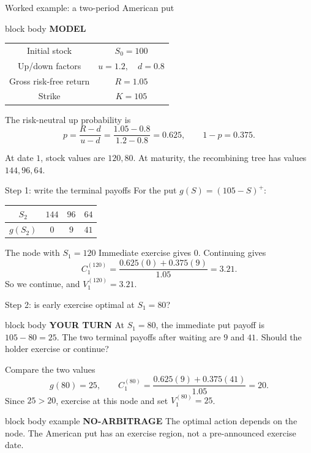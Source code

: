 \documentclass[handout,10pt,aspectratio=169]{beamer}
\newenvironment{modelbox}{\begin{beamercolorbox}[rounded=true,sep=0.7em,wd=\textwidth]{block body}
  \textbf{\color{CourseBlue}MODEL}\quad}{\end{beamercolorbox}}
\newenvironment{marketbox}{\begin{beamercolorbox}[rounded=true,sep=0.7em,wd=\textwidth]{block body example}
  \textbf{\color{CourseGreen}NO-ARBITRAGE}\quad}{\end{beamercolorbox}}
\newenvironment{pausebox}{\begin{beamercolorbox}[rounded=true,sep=0.8em,wd=\textwidth]{block body}
  \textbf{\color{CourseGold}YOUR TURN}\quad}{\end{beamercolorbox}}
\begin{document}
\begin{frame}{Worked example: a two-period American put}
\begin{modelbox}
\begin{center}
\begin{tabular}{c|c}
\toprule
Initial stock & \(S_0=100\)\\
Up/down factors & \(u=1.2,\quad d=0.8\)\\
Gross risk-free return & \(R=1.05\)\\
Strike & \(K=105\)\\
\bottomrule
\end{tabular}
\end{center}
The risk-neutral up probability is
\[
p=\frac{R-d}{u-d}=\frac{1.05-0.8}{1.2-0.8}=0.625,
\qquad 1-p=0.375.
\]
\end{modelbox}
At date \(1\), stock values are \(120,80\). At maturity, the recombining
tree has values \(144,96,64\).
\end{frame}

\begin{frame}{Step 1: write the terminal payoffs}
For the put \(g(S)=(105-S)^+\):
\begin{center}
\begin{tabular}{c|ccc}
\toprule
\(S_2\) & \(144\) & \(96\) & \(64\)\\
\midrule
\(g(S_2)\) & \(0\) & \(9\) & \(41\)\\
\bottomrule
\end{tabular}
\end{center}
\begin{block}{The node with \(S_1=120\)}
Immediate exercise gives \(0\). Continuing gives
\[
C_1^{(120)}=\frac{0.625(0)+0.375(9)}{1.05}=3.21.
\]
So we continue, and \(V_1^{(120)}=3.21\).
\end{block}
\end{frame}

\begin{frame}{Step 2: is early exercise optimal at \(S_1=80\)?}
\begin{pausebox}
At \(S_1=80\), the immediate put payoff is \(105-80=25\). The two terminal
payoffs after waiting are \(9\) and \(41\). Should the holder exercise or
continue?
\end{pausebox}

\begin{exampleblock}{Compare the two values}
\[
g(80)=25,\qquad
C_1^{(80)}=\frac{0.625(9)+0.375(41)}{1.05}=20.
\]
Since \(25>20\), exercise at this node and set \(V_1^{(80)}=25\).
\end{exampleblock}
\begin{marketbox}
The optimal action depends on the node. The American put has an exercise
region, not a pre-announced exercise date.
\end{marketbox}
\end{frame}
\end{document}
